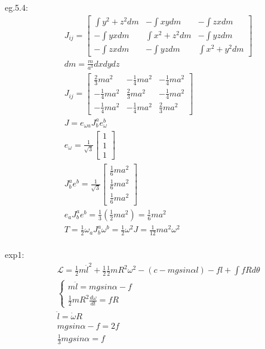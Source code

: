 \documentclass{article}
\begin{document}
eg.5.4:
\begin{align*}
&J_{ij}=\begin{bmatrix}
  \int y^2+z^2dm&-\int xy dm&-\int zx dm\\
  -\int yxdm&\int x^2+z^2 dm&-\int yzdm\\
  -\int zx dm&-\int yz dm&\int x^2+y^2 dm
\end{bmatrix}\\
&dm=\frac{m}{a^3}dxdydz \\
&J_{ij}=\begin{bmatrix}
  \frac23ma^2&-\frac14ma^2&-\frac14 ma^2\\
  -\frac14ma^2&\frac23ma^2&-\frac14ma^2\\
  -\frac14ma^2&-\frac14ma^2&\frac23ma^2
\end{bmatrix}\\
&J=e_{\omega a}J^a_be_{\omega}^b \\
&e_{\omega}=\frac1{\sqrt{3}}\begin{bmatrix}1\\1\\1\end{bmatrix} \\
&J^a_b e^b=\frac1{\sqrt{3}}\begin{bmatrix}\frac16ma^2\\\frac16ma^2\\\frac16ma^2\end{bmatrix} \\
&e_aJ^a_be^b=\frac13(\frac12ma^2)=\frac16 ma^2 \\
&T=\frac12 \omega_aJ^a_b\omega^b=\frac12 \omega^2 J=\frac1{12}ma^2\omega^2 \\
\end{align*}

exp1:
\begin{align*}
&\mathcal L=\frac12m\dot l^2+\frac12\frac12mR^2\omega^2-(c-mgsin\alpha l)-fl+\int fR d\theta \\
&\begin{cases}
  m\ddot l=mgsin\alpha -f\\
  \frac12 mR^2\frac{d\omega}{dt}=fR
\end{cases}\\
&\ddot l=\dot{\omega}R \\
&mgsin\alpha -f=2f \\
&\frac13mgsin\alpha=f \\
\end{align*}
\end{document}
